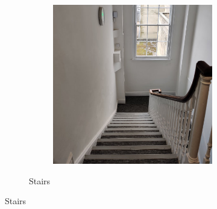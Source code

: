 \begin{figure}[p]
\begin{subfigure}[b]{\textwidth}
\begin{subfigure}[b]{0.32\textwidth}
        \end{subfigure}
        \hfill
        \begin{subfigure}[b]{0.32\textwidth}
            \centering
            \includegraphics[width=\textwidth]{content/3-Methods/enviroments/stair_3_modified.jpg}
        \end{subfigure}
        \caption{Stairs}
        \label{fig:methods-stair-example}
    \end{subfigure}
    \newline


\end{figure}
